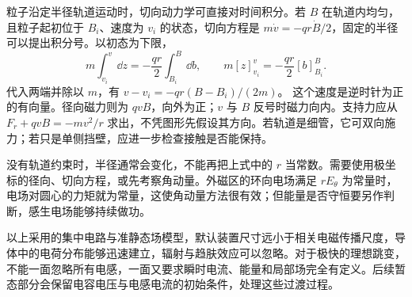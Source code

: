 粒子沿定半径轨道运动时，切向动力学可直接对时间积分。若 $B$ 在轨道内均匀，且粒子起初位于 $B_i$、速度为 $v_i$ 的状态，切向方程是
$m\dot v=-qr\dot B/2$，固定的半径可以提出积分号。以初态为下限，
\[
 m\int_{v_i}^{v}\dd z=-\frac{qr}{2}\int_{B_i}^{B}\dd b,
 \qquad m[z]_{v_i}^{v}=-\frac{qr}{2}[b]_{B_i}^{B}.
\]
代入两端并除以 $m$，有 $v-v_i=-qr(B-B_i)/(2m)$。
这个速度是逆时针为正的有向量。径向磁力则为 $qvB$，向外为正；$v$ 与 $B$ 反号时磁力向内。支持力应从 $F_r+qvB=-mv^2/r$ 求出，不凭图形先假设其方向。若轨道是细管，它可双向施力；若只是单侧挡壁，应进一步检查接触是否能保持。


没有轨道约束时，半径通常会变化，不能再把上式中的 $r$ 当常数。需要使用极坐标的径向、切向方程，或先考察角动量。外磁区的环向电场满足 $rE_\theta$ 为常量时，电场对圆心的力矩就为常量，这使角动量方法很有效；但能量是否守恒要另作判断，感生电场能够持续做功。


以上采用的集中电路与准静态场模型，默认装置尺寸远小于相关电磁传播尺度，导体中的电荷分布能够迅速建立，辐射与趋肤效应可以忽略。对于极快的理想跳变，不能一面忽略所有电感，一面又要求瞬时电流、能量和局部场完全有定义。后续暂态部分会保留电容电压与电感电流的初始条件，处理这些过渡过程。




